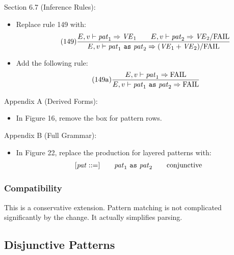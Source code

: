 \documentclass[twoside,titlepage]{article}
\begin{document}
\begin{appendix}
Section 6.7 (Inference Rules):
\begin{itemize}
\item Replace rule 149 with:
  \begin{equation}
  \tag{149}
  \frac{
  E,v \vdash \mathit{pat}_1 \Rightarrow \mathit{VE}_1
  \qquad
  E,v \vdash \mathit{pat}_2 \Rightarrow \mathit{VE}_2/\mathrm{FAIL}
  }{
  E,v \vdash \mathit{pat}_1~{\tt as}~\mathit{pat}_2 \Rightarrow (\mathit{VE}_1+\mathit{VE}_2)/\mathrm{FAIL}
  }
  \end{equation}

\item Add the following rule:
  \begin{equation}
  \tag{149a}
  \frac{
  E,v \vdash \mathit{pat}_1 \Rightarrow \mathrm{FAIL}
  }{
  E,v \vdash \mathit{pat}_1~{\tt as}~\mathit{pat}_2 \Rightarrow \mathrm{FAIL}
  }
  \end{equation}
\end{itemize}

Appendix A (Derived Forms):
\begin{itemize}
\item In Figure 16, remove the box for pattern rows.
\end{itemize}

Appendix B (Full Grammar):
\begin{itemize}
\item In Figure 22, replace the production for layered patterns with:
  $$
  \begin{array}{l@{\qquad}l@{\qquad}l}
   [\mathit{pat} ::=] & \mathit{pat}_1~{\tt as}~\mathit{pat}_2 & \textrm{conjunctive}
  \end{array}
  $$
\end{itemize}

\subsubsection*{Compatibility}

This is a conservative extension.
Pattern matching is not complicated significantly by the change. It actually simplifies parsing.


\subsection{Disjunctive Patterns}
\label{ext-disjunctivepatterns}


\end{appendix}
\end{document}
